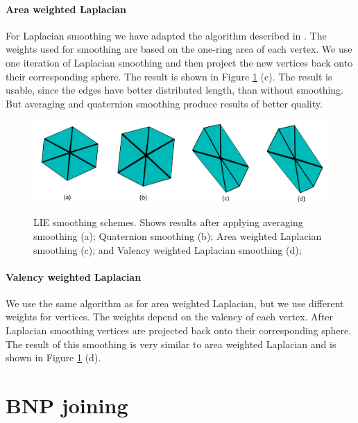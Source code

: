 \paragraph{Area weighted Laplacian}
For Laplacian smoothing we have adapted the algorithm described in \cite{laplac_phd}. The weights used for smoothing are based on the one-ring area of each vertex. We use one iteration of Laplacian smoothing and then project the new vertices back onto their corresponding sphere. The result is shown in Figure \ref{fig:smoothing_ilu} (c). The result is usable, since the edges have better distributed length, than without smoothing. But averaging and quaternion smoothing produce results of better quality.

\begin{figure}[h]
    \centering
    \includegraphics[width=\textwidth]{images/smoothing_ilu.png}
    \label{fig:smoothing_ilu}
    \caption[LIE smoothing schemes]{LIE smoothing schemes. Shows results after applying averaging smoothing (a); Quaternion smoothing (b); Area weighted Laplacian smoothing (c); and Valency weighted Laplacian smoothing (d);}
\end{figure}

\paragraph{Valency weighted Laplacian}
We use the same algorithm as for area weighted Laplacian, but we use different weights for vertices. The weights depend on the valency of each vertex. After Laplacian smoothing vertices are projected back onto their corresponding sphere. The result of this smoothing is very similar to area weighted Laplacian and is shown in Figure \ref{fig:smoothing_ilu} (d).

\section{BNP joining}